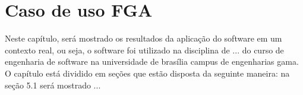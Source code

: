 \chapter{Caso de uso FGA}

Neste capítulo, será mostrado os resultados da aplicação do software em um contexto real, ou seja, o software foi
utilizado na disciplina de ... do curso de engenharia de software na universidade de brasília campus de engenharias gama.
O capítulo está dividido em seções que estão disposta da seguinte maneira: na seção 5.1 será mostrado ...
